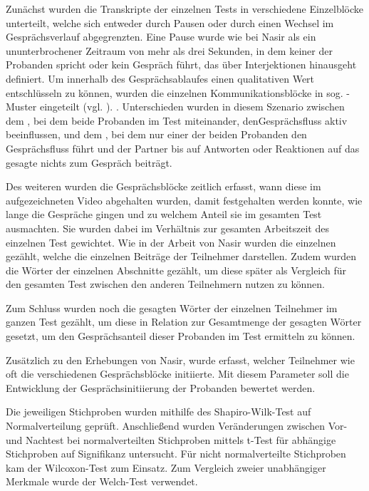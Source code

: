 Zunächst wurden die Transkripte der einzelnen Tests in verschiedene Einzelblöcke unterteilt, welche sich entweder durch Pausen oder durch einen Wechsel im Gesprächsverlauf abgegrenzten. Eine Pause wurde wie bei Nasir als ein ununterbrochener Zeitraum von mehr als drei Sekunden, in dem keiner der Probanden spricht oder kein Gespräch führt, das über Interjektionen hinausgeht definiert. Um innerhalb des Gesprächsablaufes einen qualitativen Wert entschlüsseln zu können, wurden die einzelnen Kommunikationsblöcke in sog. -Muster eingeteilt (vgl. \cite{edelsky_whos_1981}).  \cite[S. 135, eigene Übersetzung]{nasir_effect_2015}. Unterschieden wurden in diesem Szenario zwischen dem , bei dem beide Probanden im Test miteinander, denGesprächsfluss aktiv beeinflussen, und dem , bei dem nur einer der beiden Probanden den Gesprächsfluss führt und der Partner bis auf Antworten oder Reaktionen auf das gesagte nichts zum Gespräch beiträgt.

Des weiteren wurden die Gesprächsblöcke zeitlich erfasst, wann diese im aufgezeichneten Video abgehalten wurden, damit festgehalten werden konnte, wie lange die Gespräche gingen und zu welchem Anteil sie im gesamten Test ausmachten. Sie wurden dabei im Verhältnis zur gesamten Arbeitszeit des einzelnen Test gewichtet. Wie in der Arbeit von Nasir wurden die einzelnen  gezählt, welche die einzelnen Beiträge der Teilnehmer darstellen. Zudem wurden die Wörter der einzelnen Abschnitte gezählt, um diese später als Vergleich für den gesamten Test zwischen den anderen Teilnehmern nutzen zu können. 

Zum Schluss wurden noch die gesagten Wörter der einzelnen Teilnehmer im ganzen Test gezählt, um diese in Relation zur Gesamtmenge der gesagten Wörter gesetzt, um den Gesprächsanteil dieser Probanden im Test ermitteln zu können.

Zusätzlich zu den Erhebungen von Nasir, wurde erfasst, welcher Teilnehmer wie oft die verschiedenen Gesprächsblöcke initiierte. Mit diesem Parameter soll die Entwicklung der Gesprächsinitiierung der Probanden bewertet werden.

Die jeweiligen Stichproben wurden mithilfe des Shapiro-Wilk-Test auf Normalverteilung geprüft. Anschließend wurden Veränderungen zwischen Vor- und Nachtest bei normalverteilten Stichproben mittels t-Test für abhängige Stichproben auf Signifikanz untersucht. Für nicht normalverteilte Stichproben kam der Wilcoxon-Test zum Einsatz. Zum Vergleich zweier unabhängiger Merkmale wurde der Welch-Test verwendet.

